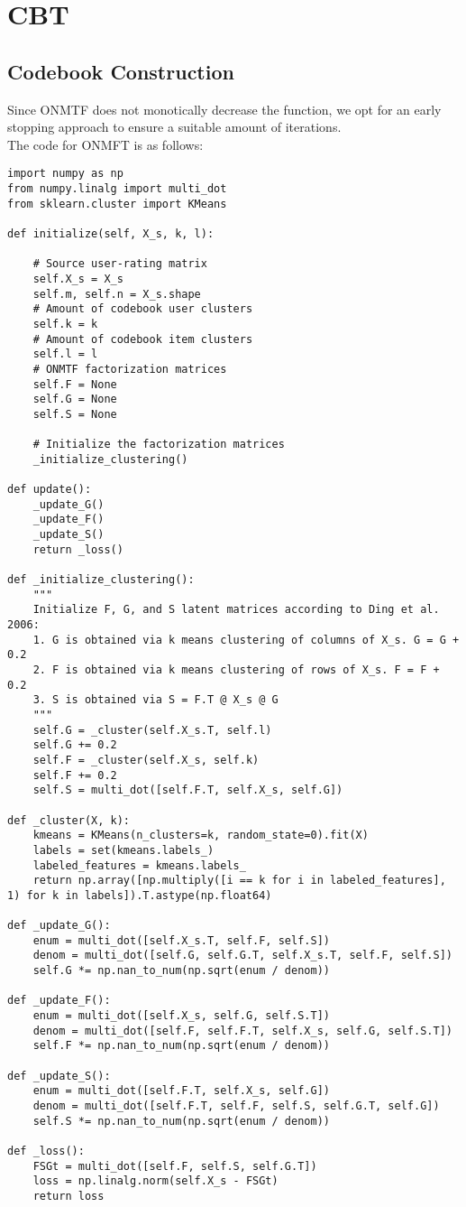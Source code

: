 \section{CBT}


\subsection{Codebook Construction}
\label{ss:cbt-codebook-construction}

Since ONMTF does not monotically decrease the function, we opt for an early stopping approach to ensure a suitable amount of iterations.\\
The code for ONMFT is as follows:
\begin{verbatim}
import numpy as np
from numpy.linalg import multi_dot
from sklearn.cluster import KMeans

def initialize(self, X_s, k, l):

    # Source user-rating matrix
    self.X_s = X_s
    self.m, self.n = X_s.shape
    # Amount of codebook user clusters
    self.k = k
    # Amount of codebook item clusters
    self.l = l
    # ONMTF factorization matrices
    self.F = None
    self.G = None
    self.S = None

    # Initialize the factorization matrices
    _initialize_clustering()

def update():
    _update_G()
    _update_F()
    _update_S()
    return _loss()

def _initialize_clustering():
    """
    Initialize F, G, and S latent matrices according to Ding et al. 2006:
    1. G is obtained via k means clustering of columns of X_s. G = G + 0.2
    2. F is obtained via k means clustering of rows of X_s. F = F + 0.2
    3. S is obtained via S = F.T @ X_s @ G
    """
    self.G = _cluster(self.X_s.T, self.l)
    self.G += 0.2
    self.F = _cluster(self.X_s, self.k)
    self.F += 0.2
    self.S = multi_dot([self.F.T, self.X_s, self.G])

def _cluster(X, k):
    kmeans = KMeans(n_clusters=k, random_state=0).fit(X)
    labels = set(kmeans.labels_)
    labeled_features = kmeans.labels_
    return np.array([np.multiply([i == k for i in labeled_features], 1) for k in labels]).T.astype(np.float64)

def _update_G():
    enum = multi_dot([self.X_s.T, self.F, self.S])
    denom = multi_dot([self.G, self.G.T, self.X_s.T, self.F, self.S])
    self.G *= np.nan_to_num(np.sqrt(enum / denom))

def _update_F():
    enum = multi_dot([self.X_s, self.G, self.S.T])
    denom = multi_dot([self.F, self.F.T, self.X_s, self.G, self.S.T])
    self.F *= np.nan_to_num(np.sqrt(enum / denom))

def _update_S():
    enum = multi_dot([self.F.T, self.X_s, self.G])
    denom = multi_dot([self.F.T, self.F, self.S, self.G.T, self.G])
    self.S *= np.nan_to_num(np.sqrt(enum / denom))

def _loss():
    FSGt = multi_dot([self.F, self.S, self.G.T])
    loss = np.linalg.norm(self.X_s - FSGt)
    return loss
\end{verbatim}
